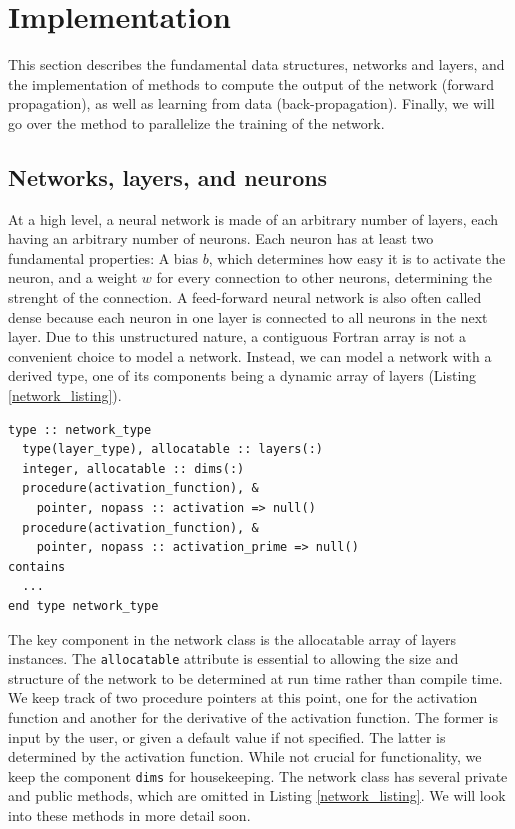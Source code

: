 \documentclass[sigplan, review=false, screen=true, balance=true]{acmart}
\begin{document}
\section{Implementation} \label{section_implementation}

This section describes the fundamental data structures, networks and layers,
and the implementation of methods to compute the output of the network
(forward propagation), as well as learning from data (back-propagation).
Finally, we will go over the method to parallelize the training of the network.

\subsection{Networks, layers, and neurons}

At a high level, a neural network is made of an arbitrary number of layers,
each having an arbitrary number of neurons. Each neuron has at least two
fundamental properties: A bias $b$, which determines how easy it is to activate
the neuron, and a weight $w$ for every connection to other neurons, determining
the strenght of the connection. A feed-forward neural network is also often
called dense because each neuron in one layer is connected to all neurons in
the next layer. Due to this unstructured nature, a contiguous Fortran array is
not a convenient choice to model a network. Instead, we can model a network
with a derived type, one of its components being a dynamic array of layers
(Listing \ref{network_listing}).

\begin{minipage}{\linewidth}
\begin{lstlisting}[caption={Definition of the network class. Type-bound methods are omitted for brevity.}, captionpos=b, label={network_listing}]
type :: network_type
  type(layer_type), allocatable :: layers(:)
  integer, allocatable :: dims(:)
  procedure(activation_function), &
    pointer, nopass :: activation => null()
  procedure(activation_function), &
    pointer, nopass :: activation_prime => null()
contains
  ...
end type network_type
\end{lstlisting}
\end{minipage}

The key component in the network class is the allocatable array of layers
instances. The \lstinline{allocatable} attribute is essential to allowing the
size and structure of the network to be determined at run time rather than compile time.
We keep track of two procedure pointers at this point, one for the activation
function and another for the derivative of the activation function. The former
is input by the user, or given a default value if not specified. The latter is
determined by the activation function. While not crucial for functionality,
we keep the component \lstinline{dims} for housekeeping.
The network class has several private and public methods, which are omitted in
Listing \ref{network_listing}. We will look into these methods in more detail
soon.
\end{document}
